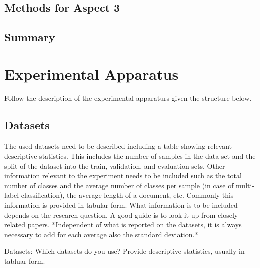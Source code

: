 \documentclass[sigconf, nonacm]{acmart}
\begin{document}
\subsection{Methods for Aspect 3}




\subsection{Summary}

\section{Experimental Apparatus}
\label{sec:experimentalapparatus}

Follow the description of the experimental apparaturs given the structure below.



\subsection{Datasets}
\label{sec:datasets}

\begin{tcolorbox}
    [title=Dataset: What needs to be included in the description?]
    The used datasets need to be described including a table showing relevant descriptive statistics. 
    This includes the number of samples in the data set and the split of the dataset into the train, validation, and evaluation sets. Other information relevant to the experiment needs to be included such as the total number of classes and the average number of classes per sample (in case of multi-label classification), the average length of a document, etc. Commonly this information is provided in tabular form. 
    What information is to be included depends on the research question. 
    A good guide is to look it up from closely related papers. *Independent of what is reported on the datasets, it is always necessary to add for each average also the standard deviation.* 
\end{tcolorbox}

Datasets: Which datasets do you use?
Provide descriptive statistics, usually in tabluar form.

\end{document}
